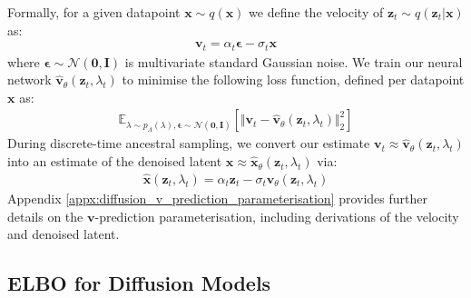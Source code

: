 \documentclass[ oneside,%
                    author={George Herbert},
                    degree={MSci},
                     title={Video Diffusion Models for Climate Simulations},
                  subtitle={}]{dissertation}
\begin{document}
Formally, for a given datapoint $\mathbf{x}\sim q(\mathbf{x})$  we define the velocity of $\mathbf{z}_t\sim q(\mathbf{z}_t|\mathbf{x})$ as:
\begin{align}
      \mathbf{v}_t=\alpha_t\boldsymbol\epsilon - \sigma_t\mathbf{x}
\end{align}
where $\boldsymbol\epsilon\sim\mathcal{N}(\mathbf{0}, \mathbf{I})$ is multivariate standard Gaussian noise. We train our neural network $\hat{\mathbf{v}}_\theta(\mathbf{z}_t,\lambda_t)$ to minimise the following loss function, defined per datapoint $\mathbf{x}$ as:
\begin{align}
      \mathbb{E}_{\lambda\sim p_\Lambda(\lambda),\boldsymbol\epsilon\sim\mathcal{N}(\mathbf{0},\mathbf{I})}\left[\Vert\mathbf{v}_t-\hat{\mathbf{v}}_\theta(\mathbf{z}_t, \lambda_t)\Vert_2^2\right]\label{eq:v_parameterisation_loss}
\end{align}
During discrete-time ancestral sampling, we convert our estimate $\mathbf{v}_t\approx\hat{\mathbf{v}}_\theta(\mathbf{z}_t,\lambda_t)$ into an estimate of the denoised latent $\mathbf{x}\approx\hat{\mathbf{x}}_\theta(\mathbf{z}_t,\lambda_t)$ via:
\begin{align}
      \hat{\mathbf{x}}(\mathbf{z}_t,\lambda_t)=\alpha_t\mathbf{z}_t-\sigma_t\hat{\mathbf{v}}_\theta(\mathbf{z}_t,\lambda_t)
\end{align}
Appendix \ref{appx:diffusion_v_prediction_parameterisation} provides further details on the $\mathbf{v}$-prediction parameterisation, including derivations of the velocity and denoised latent.

\subsection{ELBO for Diffusion Models}
\label{sec:background_diffusion_elbo}
\end{document}
